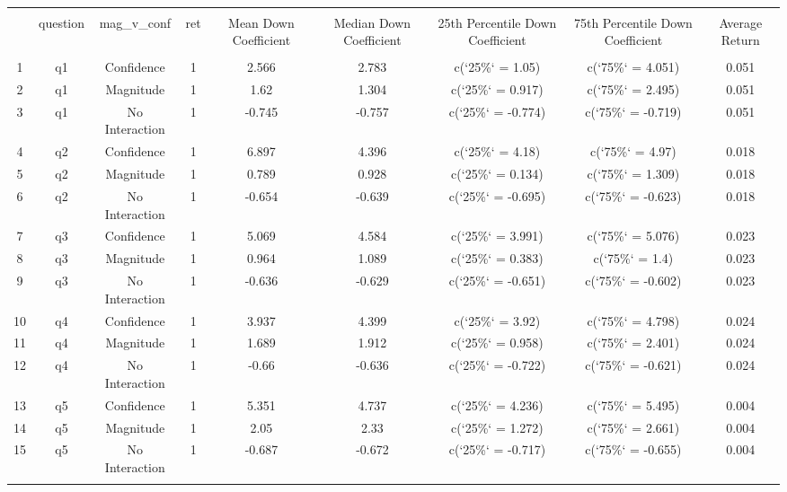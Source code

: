 
\begin{table}[!htbp] \centering 
  \caption{} 
  \label{} 
\begin{tabular}{@{\extracolsep{5pt}} ccccccccc} 
\\[-1.8ex]\hline 
\hline \\[-1.8ex] 
 & question & mag\_v\_conf & ret & Mean Down Coefficient & Median Down Coefficient & 25th Percentile Down Coefficient & 75th Percentile Down Coefficient & Average Return \\ 
\hline \\[-1.8ex] 
1 & q1 & Confidence & 1 & 2.566 & 2.783 & c(`25\%` = 1.05) & c(`75\%` = 4.051) & 0.051 \\ 
2 & q1 & Magnitude & 1 & 1.62 & 1.304 & c(`25\%` = 0.917) & c(`75\%` = 2.495) & 0.051 \\ 
3 & q1 & No Interaction & 1 & -0.745 & -0.757 & c(`25\%` = -0.774) & c(`75\%` = -0.719) & 0.051 \\ 
4 & q2 & Confidence & 1 & 6.897 & 4.396 & c(`25\%` = 4.18) & c(`75\%` = 4.97) & 0.018 \\ 
5 & q2 & Magnitude & 1 & 0.789 & 0.928 & c(`25\%` = 0.134) & c(`75\%` = 1.309) & 0.018 \\ 
6 & q2 & No Interaction & 1 & -0.654 & -0.639 & c(`25\%` = -0.695) & c(`75\%` = -0.623) & 0.018 \\ 
7 & q3 & Confidence & 1 & 5.069 & 4.584 & c(`25\%` = 3.991) & c(`75\%` = 5.076) & 0.023 \\ 
8 & q3 & Magnitude & 1 & 0.964 & 1.089 & c(`25\%` = 0.383) & c(`75\%` = 1.4) & 0.023 \\ 
9 & q3 & No Interaction & 1 & -0.636 & -0.629 & c(`25\%` = -0.651) & c(`75\%` = -0.602) & 0.023 \\ 
10 & q4 & Confidence & 1 & 3.937 & 4.399 & c(`25\%` = 3.92) & c(`75\%` = 4.798) & 0.024 \\ 
11 & q4 & Magnitude & 1 & 1.689 & 1.912 & c(`25\%` = 0.958) & c(`75\%` = 2.401) & 0.024 \\ 
12 & q4 & No Interaction & 1 & -0.66 & -0.636 & c(`25\%` = -0.722) & c(`75\%` = -0.621) & 0.024 \\ 
13 & q5 & Confidence & 1 & 5.351 & 4.737 & c(`25\%` = 4.236) & c(`75\%` = 5.495) & 0.004 \\ 
14 & q5 & Magnitude & 1 & 2.05 & 2.33 & c(`25\%` = 1.272) & c(`75\%` = 2.661) & 0.004 \\ 
15 & q5 & No Interaction & 1 & -0.687 & -0.672 & c(`25\%` = -0.717) & c(`75\%` = -0.655) & 0.004 \\ 
\hline \\[-1.8ex] 
\end{tabular} 
\end{table} 
